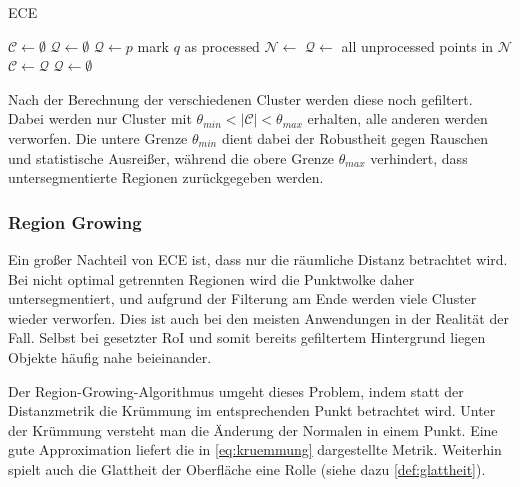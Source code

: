 \begin{algorithm}
\caption{\acl{ECE}}
\label{alg:euclidean-cluster-extraction}
\begin{algorithmic}
\State $\mathcal{C} \gets \emptyset$
\State $\mathcal{Q} \gets \emptyset$
	\State $\mathcal{Q} \gets p$
		\State mark $q$ as processed
		\State $\mathcal{N} \gets$ 
		\State $\mathcal{Q} \gets$ all unprocessed points in $\mathcal{N}$
	\EndFor
	\State $\mathcal{C} \gets \mathcal{Q}$
	\State $\mathcal{Q} \gets \emptyset$
\EndFor
\State {}
\end{algorithmic}
\end{algorithm}

Nach der Berechnung der verschiedenen Cluster werden diese noch gefiltert.
Dabei werden nur Cluster mit $\theta_{min} < |\mathcal{C}| < \theta_{max}$ erhalten, alle anderen werden verworfen.
Die untere Grenze $\theta_{min}$ dient dabei der Robustheit gegen Rauschen und statistische Ausreißer, während die obere Grenze $\theta_{max}$ verhindert, dass untersegmentierte Regionen zurückgegeben werden.

\subsubsection{Region Growing}
\label{subsubsec:region-growing}

Ein großer Nachteil von \ac{ECE} ist, dass nur die räumliche Distanz betrachtet wird.
Bei nicht optimal getrennten Regionen wird die Punktwolke daher untersegmentiert, und aufgrund der Filterung am Ende werden viele Cluster wieder verworfen.
Dies ist auch bei den meisten Anwendungen in der Realität der Fall.
Selbst bei gesetzter \ac{RoI} und somit bereits gefiltertem Hintergrund liegen Objekte häufig nahe beieinander.

Der Region-Growing-Algorithmus umgeht dieses Problem, indem statt der Distanzmetrik die Krümmung im entsprechenden Punkt betrachtet wird.
Unter der Krümmung versteht man die Änderung der Normalen in einem Punkt.
Eine gute Approximation liefert die in \autoref{eq:kruemmung} dargestellte Metrik.
Weiterhin spielt auch die Glattheit der Oberfläche eine Rolle (siehe dazu \autoref{def:glattheit}).

